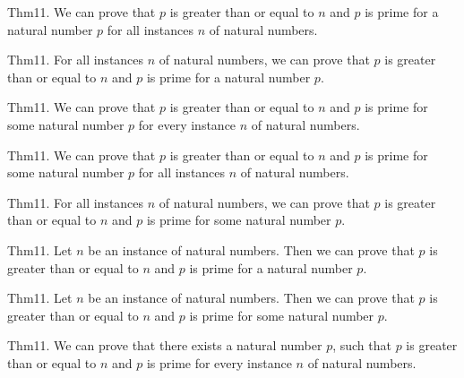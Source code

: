 \documentclass{article}
\begin{document}
Thm11. We can prove that $p$ is greater than or equal to $n$ and $p$ is prime for a natural number $p$ for all instances $n$ of natural numbers.

Thm11. For all instances $n$ of natural numbers, we can prove that $p$ is greater than or equal to $n$ and $p$ is prime for a natural number $p$.

Thm11. We can prove that $p$ is greater than or equal to $n$ and $p$ is prime for some natural number $p$ for every instance $n$ of natural numbers.

Thm11. We can prove that $p$ is greater than or equal to $n$ and $p$ is prime for some natural number $p$ for all instances $n$ of natural numbers.

Thm11. For all instances $n$ of natural numbers, we can prove that $p$ is greater than or equal to $n$ and $p$ is prime for some natural number $p$.

Thm11. Let $n$ be an instance of natural numbers. Then we can prove that $p$ is greater than or equal to $n$ and $p$ is prime for a natural number $p$.

Thm11. Let $n$ be an instance of natural numbers. Then we can prove that $p$ is greater than or equal to $n$ and $p$ is prime for some natural number $p$.

Thm11. We can prove that there exists a natural number $p$, such that $p$ is greater than or equal to $n$ and $p$ is prime for every instance $n$ of natural numbers.
\end{document}
